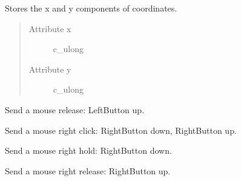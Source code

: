 \documentclass[letterpaper,10pt,english]{sphinxmanual}
\begin{document}

\begin{fulllineitems}
\label{macro:macro.POINT}
Stores the x and y components of coordinates.
\begin{quote}\begin{description}
\item[{Attribute x}] \leavevmode
c\_ulong

\item[{Attribute y}] \leavevmode
c\_ulong

\end{description}\end{quote}

\end{fulllineitems}


\begin{fulllineitems}
\label{macro:macro.Release}
Send a mouse release: LeftButton up.

\end{fulllineitems}


\begin{fulllineitems}
\label{macro:macro.RightClick}
Send a mouse right click: RightButton down, RightButton up.

\end{fulllineitems}


\begin{fulllineitems}
\label{macro:macro.RightHold}
Send a mouse right hold: RightButton down.

\end{fulllineitems}


\begin{fulllineitems}
\label{macro:macro.RightRelease}
Send a mouse right release: RightButton up.

\end{fulllineitems}
\end{document}
